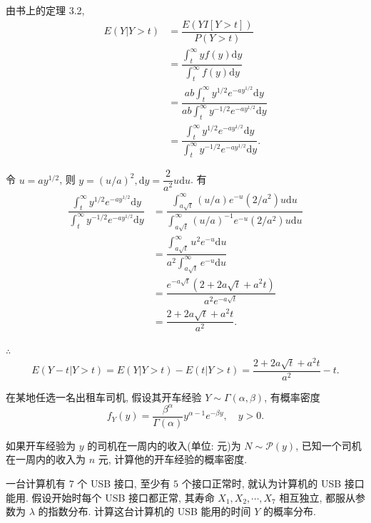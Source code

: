 \documentclass[color=black,device=normal,lang=cn]{elegantnote}
\numberwithin{equation}{section}
\theoremstyle{plain}
\numberwithin{exercise}{exsection}
\begin{document}
\begin{solution}
    由书上的定理 3.2,
    \begin{align*}
        E(Y|Y>t) & =\dfrac{E(YI[Y>t])}{P(Y>t)} \\
        & =\dfrac{\int_t^\infty yf(y)\mathrm{d}y}{\int_t^\infty f(y)\mathrm{d}y} \\
        & =\dfrac{ab\int_t^\infty y^{1/2}e^{-ay^{1/2}}\mathrm{d}y}{ab\int_t^\infty y^{-1/2}e^{-ay^{1/2}}\mathrm{d}y} \\
        & =\dfrac{\int_t^\infty y^{1/2}e^{-ay^{1/2}}\mathrm{d}y}{\int_t^\infty y^{-1/2}e^{-ay^{1/2}}\mathrm{d}y}.
    \end{align*}

    令 $u=ay^{1/2}$, 则 $y=(u/a)^2,\mathrm{d}y=\dfrac{2}{a^2}u\mathrm{d}u$. 有
    \begin{align*}
        \dfrac{\int_t^\infty y^{1/2}e^{-ay^{1/2}}\mathrm{d}y}{\int_t^\infty y^{-1/2}e^{-ay^{1/2}}\mathrm{d}y} & =\dfrac{\int_{a\sqrt{t}}^\infty(u/a)e^{-u}(2/a^2)u\mathrm{d}u}{\int_{a\sqrt{t}}^\infty(u/a)^{-1}e^{-u}(2/a^2)u\mathrm{d}u} \\
        & =\dfrac{\int_{a\sqrt{t}}^\infty u^2e^{-u}\mathrm{d}u}{a^2\int_{a\sqrt{t}}^\infty e^{-u}\mathrm{d}u} \\
        & =\dfrac{e^{-a\sqrt{t}}(2+2a\sqrt{t}+a^2t)}{a^2e^{-a\sqrt{t}}} \\
        & =\dfrac{2+2a\sqrt{t}+a^2t}{a^2}.
    \end{align*}

    $\therefore$
    \[E(Y-t|Y>t)=E(Y|Y>t)-E(t|Y>t)=\dfrac{2+2a\sqrt{t}+a^2t}{a^2}-t.\]
\end{solution}
\begin{exercise}%
    在某地任选一名出租车司机, 假设其开车经验 $Y\sim\Gamma(\alpha,\beta)$, 有概率密度
    \[f_Y(y)=\dfrac{\beta^\alpha}{\Gamma(\alpha)}y^{\alpha-1}e^{-\beta y},\quad y>0.\]

    如果开车经验为 $y$ 的司机在一周内的收入(单位: 元)为 $N\sim\mathcal{P}(y)$, 已知一个司机在一周内的收入为 $n$ 元, 计算他的开车经验的概率密度.
\end{exercise}
\begin{solution}
\end{solution}
\begin{exercise}%
    一台计算机有 $7$ 个 USB 接口, 至少有 $5$ 个接口正常时, 就认为计算机的 USB 接口能用. 假设开始时每个 USB 接口都正常, 其寿命 $X_1,X_2,\cdots,X_7$ 相互独立, 都服从参数为 $\lambda$ 的指数分布. 计算这台计算机的 USB 能用的时间 $Y$ 的概率分布.
\end{exercise}
\end{document}
